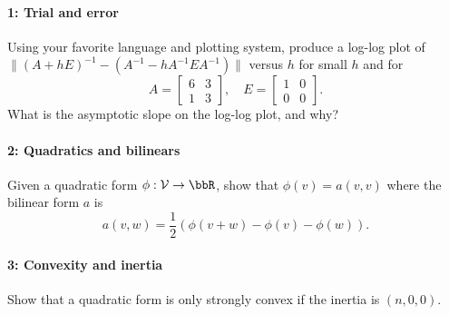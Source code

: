 \documentclass[12pt, leqno]{article} %
\begin{document}

\paragraph*{1: Trial and error}
Using your favorite language and plotting system, produce a log-log
plot of $\|(A+hE)^{-1}-(A^{-1}-h A^{-1} E A^{-1})\|$ versus $h$ for
small $h$ and for
\[
  A = \begin{bmatrix} 6 & 3 \\ 1 & 3 \end{bmatrix}, \quad
  E = \begin{bmatrix} 1 & 0 \\ 0 & 0 \end{bmatrix}.
\]
What is the asymptotic slope on the log-log plot, and why?  

\paragraph*{2: Quadratics and bilinears}
Given a quadratic form $\phi : \mathcal{V} \rightarrow \bbR$,
show that $\phi(v) = a(v,v)$ where the bilinear form $a$ is
\[
  a(v,w) = \frac{1}{2} \left( \phi(v+w)-\phi(v)-\phi(w) \right).
\]

\paragraph*{3: Convexity and inertia}
Show that a quadratic form is only strongly convex if the inertia is $(n,0,0)$.

\end{document}
